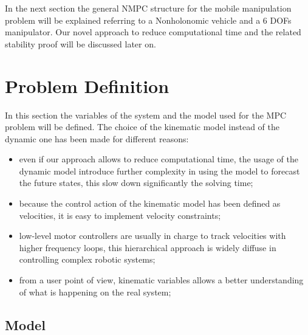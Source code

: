In the next section the general NMPC structure for the mobile manipulation problem will be explained referring to a Nonholonomic vehicle and a 6 DOFs manipulator. Our novel approach to reduce computational time and the related stability proof will be discussed later on.

\section{Problem Definition}

In this section the variables of the system and the model used for the MPC problem will be defined. The choice of the kinematic model instead of the dynamic one has been made for different reasons:

\begin{itemize}
\item even if our approach allows to reduce computational time, the usage of the dynamic model introduce further complexity in using the model to forecast the future states, this slow down significantly the solving time;
\item because the control action of the kinematic model has been defined as velocities, it is easy to implement velocity constraints;
\item low-level motor controllers are usually in charge to track velocities with higher frequency loops, this hierarchical approach is widely diffuse in controlling complex robotic systems;
\item from a user point of view, kinematic variables allows a better understanding of what is happening on the real system;
\end{itemize}

\subsection{Model}

